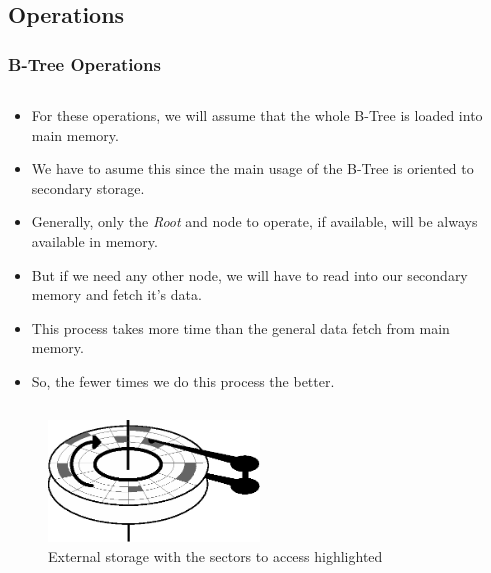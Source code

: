 \documentclass{beamer}
\begin{document}
\begin{frame}
    \subsection{Operations}
    \frametitle{B-Tree Operations}
    \begin{columns}
        \begin{column}{\textlecolumn}
            \begin{block}{}
                \begin{itemize}
                    \item For these operations, we will assume that the whole B-Tree is loaded into main memory.
                    \item We have to asume this since the main usage of the B-Tree is oriented to secondary storage.
                    \item Generally, only the \emph{Root} and node to operate, if available, will be always available in memory.
                    \item But if we need any other node, we will have to read into our secondary memory and fetch it's data.
                    \item This process takes more time than the general data fetch from main memory.
                    \item So, the fewer times we do this process the better.
                \end{itemize}
            \end{block}
        \end{column}
        \begin{column}{\textricolumn}
        \end{column}
    \end{columns}
    \begin{figure}[h!]
        \includegraphics[width=0.5\textwidth]{resources/made/external_storage_wblocks.eps}
        \caption{External storage with the sectors to access highlighted}
    \end{figure}
\end{frame}
\end{document}
